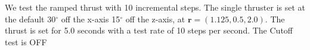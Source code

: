 We test the ramped thrust with 10 incremental steps. The single thruster is set at the default 30$^\circ$ off the x-axis 15$^\circ$ off the z-axis, at $\bm r = \left(1.125,0.5,2.0\right)$. The thrust is set for 5.0 seconds with a test rate of 10 steps per second. The Cutoff test is OFF